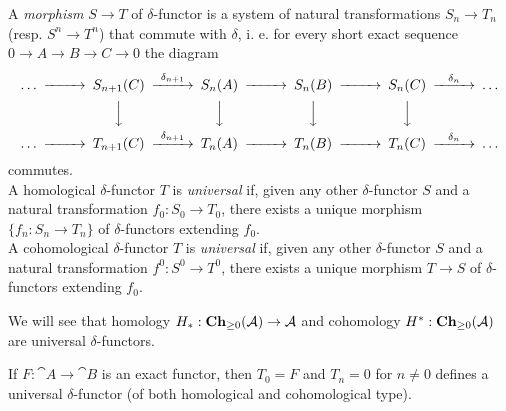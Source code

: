 \begin{definition}
	A \textit{morphism} $S \rightarrow T$ of $\delta$-functor is a system of natural transformations $S_n \rightarrow T_n$ (resp. $S^n \rightarrow T^n$) that commute with $\delta$, i. e. for every short exact sequence $0 \rightarrow A \rightarrow B \rightarrow C \rightarrow 0$ the diagram
	\begin{align*}
		\begin{CD}
			\dots @>>> S_{n+1}(C) @>\delta_{n+1}>> S_n(A) @>>> S_n(B) @>>> S_n(C) @>\delta_n>> \dots \\
			@.			@VVV						@VVV		@VVV		@VVV				@. \\
			\dots @>>> T_{n+1}(C) @>\delta_{n+1}>> T_n(A) @>>> T_n(B) @>>> T_n(C) @>\delta_n>> \dots			
		\end{CD}
	\end{align*}
	commutes. \\
	A homological $\delta$-functor $T$ is \textit{universal} if, given any other $\delta$-functor $S$ and a natural transformation $f_0:S_0\rightarrow T_0$, there exists a unique morphism $\{f_n:S_n\rightarrow T_n\}$ of $\delta$-functors extending $f_0$. \\
	A cohomological $\delta$-functor $T$ is \textit{universal} if, given any other $\delta$-functor $S$ and a natural transformation $f^0:S^0\rightarrow T^0$, there exists a unique morphism $T\rightarrow S$ of $\delta$-functors extending $f_0$.
\end{definition}

\begin{example}
	We will see that homology $H_*:\textrm{\textup{\textbf{Ch}}}_{\geq0}(\mathcal{A}) \rightarrow \mathcal{A}$ and cohomology $H^*:\textrm{\textup{\textbf{Ch}}}_{\geq0}(\mathcal{A})$ are universal $\delta$-functors.
\end{example}

\begin{exercise}
	If $F:\cat{A}\rightarrow\cat{B}$ is an exact functor, then $T_0=F$ and $T_n=0$ for $n\neq0$ defines a universal $\delta$-functor (of both homological and cohomological type).
\end{exercise}

